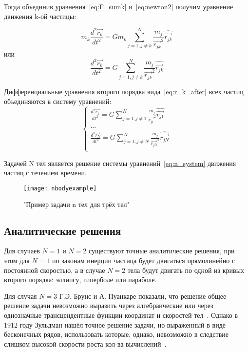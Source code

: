 Тогда объединив уравнения~\ref{eq:F_sumk} и~\ref{eq:newton2} получим уравнение движения k-ой частицы:
 
 \begin{equation}
 	\label{eq:r_k_before}
 	m_k\frac{d^2\vec{r_k}}{dt^2} = Gm_k\sum_{j=1, j \neq k}^{N}{\frac{m_j}{\vec{r_{jk}}^2}\hat{\vec{r_{jk}}}}
 \end{equation}
 или
 \begin{equation}
 	\label{eq:r_k_after}
 	\frac{d^2\vec{r_k}}{dt^2} = G\sum_{j=1, j \neq k}^{N}{\frac{m_j}{\vec{r_{jk}}^2}\hat{\vec{r_{jk}}}}
 \end{equation}
 
 Дифференциальные уравнения второго порядка вида~\ref{eq:r_k_after} всех частиц объединяются в систему уравнений:
  \begin{equation}
 	\label{eq:n_system}
 	\begin{cases}
 		\frac{d^2\vec{r_1}}{dt^2} = G\sum_{j=1, j \neq 1}^{N}{\frac{m_j}{\vec{r_{j1}}^2}\hat{\vec{r_{j1}}}} \\
 		\dots \\
 		\frac{d^2\vec{r_N}}{dt^2} = G\sum_{j=1, j \neq N}^{N}{\frac{m_j}{\vec{r_{jN}}^2}\hat{\vec{r_{jN}}}} \\
 	\end{cases}
 \end{equation}

Задачей N тел является решение системы уравнений~\ref{eq:n_system} движения частиц с течением времени.

\begin{figure}[h]
	\centering
	\texttt{[image: nbodyexample]}
	\caption{"Пример задачи n тел для трёх тел"}
	\label{fig:nbodyexample}
\end{figure}
\subsection*{Аналитические решения}
Для случаев $N = 1$ и $N = 2$ существуют точные аналитические решения, при этом для $N = 1$ по законам инерции частица будет двигаться прямолинейно с постоянной скоростью, а в случае $N = 2$ тела будут двигать по одной из кривых второго порядка: эллипсу, гиперболе или параболе.

Для случая $N = 3$ Г.Э. Брунс и А. Пуанкаре показали, что решение общее решение задачи невозможно выразить через алгебраические или через однозначные трансцендентные функции координат и скоростей тел~\cite{markeev}. Однако в 1912 году Зульдман нашёл точное решение задачи, но выраженный в виде бесконечных рядов, использовать которые, однако, невозможно в следствие слишком высокой скорости роста кол-ва вычислений~\cite{markeev}.

